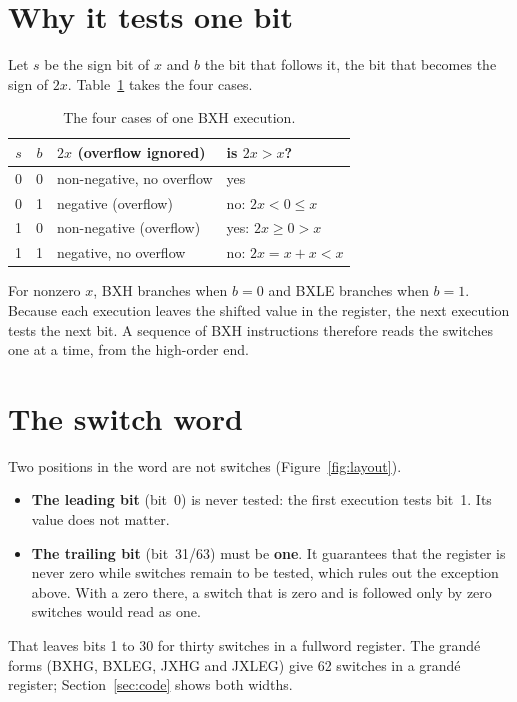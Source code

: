 \documentclass[11pt]{article}
\begin{document}
\section{Why it tests one bit}

Let $s$ be the sign bit of $x$ and $b$ the bit that follows it, the bit that
becomes the sign of $2x$. Table~\ref{tab:cases} takes the four cases.

\begin{table}[ht]
\centering
\begin{tabular}{ccll}
\toprule
$s$ & $b$ & $2x$ (overflow ignored) & is $2x > x$? \\
\midrule
0 & 0 & non-negative, no overflow & yes \\
0 & 1 & negative (overflow) & no: $2x < 0 \le x$ \\
1 & 0 & non-negative (overflow) & yes: $2x \ge 0 > x$ \\
1 & 1 & negative, no overflow & no: $2x = x + x < x$ \\
\bottomrule
\end{tabular}
\caption{The four cases of one BXH execution.}
\label{tab:cases}
\end{table}

For nonzero $x$, BXH branches when $b = 0$ and BXLE branches when $b = 1$.
Because each
execution leaves the shifted value in the register, the next execution tests
the next bit. A sequence of BXH instructions therefore reads the switches
one at a time, from the high-order end.

\section{The switch word}

Two positions in the word are not switches (Figure~\ref{fig:layout}).
\begin{itemize}
\item \textbf{The leading bit} (bit~0) is never tested: the first execution
  tests bit~1. Its value does not matter.
\item \textbf{The trailing bit} (bit~31/63) must be \textbf{one}. It guarantees
  that the register is never zero while switches remain to be tested, which
  rules out the exception above. With a zero there, a switch that is zero
  and is followed only by zero switches would read as one.
\end{itemize}
That leaves bits 1 to 30 for thirty switches in a fullword register. The grandé forms
(BXHG, BXLEG, JXHG and JXLEG) give 62 switches in a grandé register;
Section~\ref{sec:code}
shows both widths.
\end{document}
